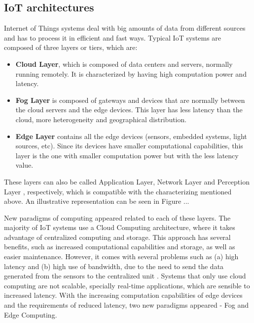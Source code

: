 \subsection{IoT architectures}\label{sec:architectures}

Internet of Things systems deal with big amounts of data from different sources and has to process it in efficient and fast ways. Typical IoT systems are composed of three layers or tiers, which are:

\begin{itemize}
    \item \textbf{Cloud Layer}, which is composed of data centers and servers, normally running remotely. It is characterized by having high computation power and latency.
    \item \textbf{Fog Layer} is composed of gateways and devices that are normally between the cloud servers and the edge devices. This layer has less latency than the cloud, more heterogeneity and geographical distribution.
    \item \textbf{Edge Layer} contains all the edge devices (sensors, embedded systems, light sources, etc). Since its devices have smaller computational capabilities, this layer is the one with smaller computation power but with the less latency value.
\end{itemize}

\par These layers can also be called Application Layer, Network Layer and Perception Layer \cite{iot_layers}, respectively, which is compatible with the characterizing mentioned above. An illustrative representation can be seen in Figure ...

\par New paradigms of computing appeared related to each of these layers. The majority of IoT systems use a Cloud Computing architecture, where it takes advantage of centralized computing and storage. This approach has several benefits, such as increased computational capabilities and storage, as well as easier maintenance. However, it comes with several problems such as (a) high latency and (b) high use of bandwidth, due to the need to send the data generated from the sensors to the centralized unit \cite{connecting_fog_and_cloud}. Systems that only use cloud computing are not scalable, specially real-time applications, which are sensible to increased latency. With the increasing computation capabilities of edge devices and the requirements of reduced latency, two new paradigms appeared - Fog and Edge Computing.

